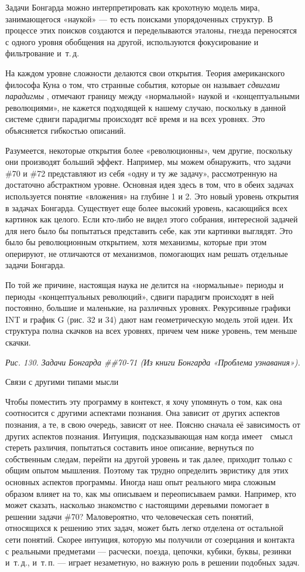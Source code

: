 \documentclass[../main.tex]{subfiles}
\begin{document}
Задачи Бонгарда можно интерпретировать как крохотную модель мира, занимающегося «наукой» --- то есть поисками упорядоченных структур. В процессе этих поисков создаются и переделываются эталоны, гнезда переносятся с одного уровня обобщения на другой, используются фокусирование и фильтрование и~т.\,д.

На каждом уровне сложности делаются свои открытия. Теория американского философа Куна о том, что странные события, которые он называет \emph{сдвигами парадигмы} , отмечают границу между «нормальной» наукой и «концептуальными революциями», не кажется подходящей к нашему случаю, поскольку в данной системе сдвиги парадигмы происходят всё время и на всех уровнях. Это объясняется гибкостью описаний.

Разумеется, некоторые открытия более «революционны», чем другие, поскольку они производят больший эффект. Например, мы можем обнаружить, что задачи \#70 и \#72 представляют из себя «одну и ту же задачу», рассмотренную на достаточно абстрактном уровне. Основная идея здесь в том, что в обеих задачах используется понятие «вложения» на глубине 1 и 2. Это новый уровень открытия в задачах Бонгарда. Существует еще более высокий уровень, касающийся всех картинок как целого. Если кто-либо не видел этого собрания, интересной задачей для него было бы попытаться представить себе, как эти картинки выглядят. Это было бы революционным открытием, хотя механизмы, которые при этом оперируют, не отличаются от механизмов, помогающих нам решать отдельные задачи Бонгарда.

По той же причине, настоящая наука не делится на «нормальные» периоды и периоды «концептуальных революций», сдвиги парадигм происходят в ней постоянно, большие и маленькие, на различных уровнях. Рекурсивные графики INT и график G (рис. 32 и 34) дают нам геометрическую модель этой идеи. Их структура полна скачков на всех уровнях, причем чем ниже уровень, тем меньше скачки.

\emph{Рис. 130. Задачи Бонгарда \#\#70-71 (Из книги Бонгарда «Проблема узнавания»).}

Связи с другими типами мысли

Чтобы поместить эту программу в контекст, я хочу упомянуть о том, как она соотносится с другими аспектами познания. Она зависит от других аспектов познания, а те, в свою очередь, зависят от нее. Поясню сначала её зависимость от других аспектов познания. Интуиция, подсказывающая нам когда имеет~~смысл стереть различия, попытаться составить иное описание, вернуться по собственным следам, перейти на другой уровень и так далее, приходит только с общим опытом мышления. Поэтому так трудно определить эвристику для этих основных аспектов программы. Иногда наш опыт реального мира сложным образом влияет на то, как мы описываем и переописываем рамки. Например, кто может сказать, насколько знакомство с настоящими деревьями помогает в решении задачи \#70? Маловероятно, что человеческая сеть понятий, относящихся к решению этих задач, может быть легко отделена от остальной сети понятий. Скорее интуиция, которую мы получили от созерцания и контакта с реальными предметами --- расчески, поезда, цепочки, кубики, буквы, резинки и~т.\,д., и~т.\,п. --- играет незаметную, но важную роль в решении подобных задач.
\end{document}
